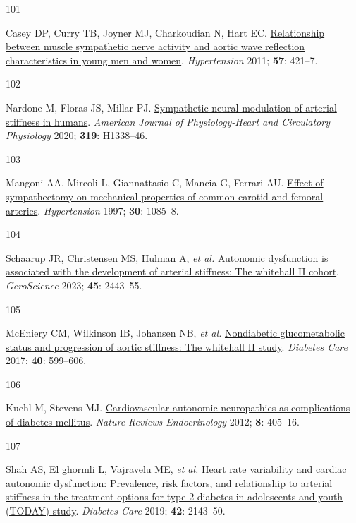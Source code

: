 \documentclass[
  a4paper,
  headsepline=true,
  open=left]{scrbook}
\newlength{\cslhangindent}
\newlength{\csllabelwidth}
\newlength{\cslentryspacingunit} %
\newenvironment{CSLReferences}[2] %
 {%
  \setlength{\parindent}{0pt}
  \ifodd #1
  \let\oldpar\par
  \def\par{\hangindent=\cslhangindent\oldpar}
  \fi
  \setlength{\parskip}{#2\cslentryspacingunit}
 }%
 {}
\newcommand{\CSLLeftMargin}[1]{\parbox[t]{\csllabelwidth}{#1}}
\newcommand{\CSLRightInline}[1]{\parbox[t]{\linewidth - \csllabelwidth}{#1}\break}
\begin{document}
\begin{CSLReferences}{0}{0}
\leavevmode{}%
\CSLLeftMargin{101 }%
\CSLRightInline{Casey DP, Curry TB, Joyner MJ, Charkoudian N, Hart EC.
\href{https://doi.org/10.1161/HYPERTENSIONAHA.110.164517}{Relationship
between muscle sympathetic nerve activity and aortic wave reflection
characteristics in young men and women}. \emph{Hypertension} 2011;
\textbf{57}: 421--7.}

\leavevmode{}%
\CSLLeftMargin{102 }%
\CSLRightInline{Nardone M, Floras JS, Millar PJ.
\href{https://doi.org/10.1152/ajpheart.00734.2020}{Sympathetic neural
modulation of arterial stiffness in humans}. \emph{American Journal of
Physiology-Heart and Circulatory Physiology} 2020; \textbf{319}:
H1338--46.}

\leavevmode{}%
\CSLLeftMargin{103 }%
\CSLRightInline{Mangoni AA, Mircoli L, Giannattasio C, Mancia G, Ferrari
AU. \href{https://doi.org/10.1161/01.HYP.30.5.1085}{Effect of
sympathectomy on mechanical properties of common carotid and femoral
arteries}. \emph{Hypertension} 1997; \textbf{30}: 1085--8.}

\leavevmode{}%
\CSLLeftMargin{104 }%
\CSLRightInline{Schaarup JR, Christensen MS, Hulman A, \emph{et al.}
\href{https://doi.org/10.1007/s11357-023-00762-0}{Autonomic dysfunction
is associated with the development of arterial stiffness: The whitehall
II cohort}. \emph{GeroScience} 2023; \textbf{45}: 2443--55.}

\leavevmode{}%
\CSLLeftMargin{105 }%
\CSLRightInline{McEniery CM, Wilkinson IB, Johansen NB, \emph{et al.}
\href{https://doi.org/10.2337/dc16-1773}{Nondiabetic glucometabolic
status and progression of aortic stiffness: The whitehall II study}.
\emph{Diabetes Care} 2017; \textbf{40}: 599--606.}

\leavevmode{}%
\CSLLeftMargin{106 }%
\CSLRightInline{Kuehl M, Stevens MJ.
\href{https://doi.org/10.1038/nrendo.2012.21}{Cardiovascular autonomic
neuropathies as complications of diabetes mellitus}. \emph{Nature
Reviews Endocrinology} 2012; \textbf{8}: 405--16.}

\leavevmode{}%
\CSLLeftMargin{107 }%
\CSLRightInline{Shah AS, El ghormli L, Vajravelu ME, \emph{et al.}
\href{https://doi.org/10.2337/dc19-0993}{Heart rate variability and
cardiac autonomic dysfunction: Prevalence, risk factors, and
relationship to arterial stiffness in the treatment options for type 2
diabetes in adolescents and youth (TODAY) study}. \emph{Diabetes Care}
2019; \textbf{42}: 2143--50.}


\end{CSLReferences}
\end{document}
